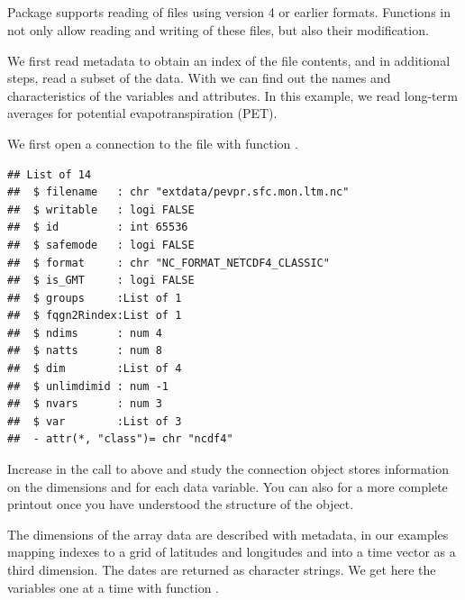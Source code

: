 \documentclass[krantz2]{krantz}\usepackage{knitr}
\begin{document}
\subsection[ncdf4]{}



Package  supports reading of files using  version 4 or earlier formats. Functions in  not only allow reading and writing of these files, but also their modification.

We first read metadata to obtain an index of the file contents, and in additional steps, read a subset of the data. With  we can find out the names and characteristics of the variables and attributes. In this example, we read long-term averages for potential evapotranspiration (PET).

We first open a connection to the file with function .

\begin{knitrout}\footnotesize
{}\color{fgcolor}\begin{kframe}
\begin{alltt}
 \hlkwb{<-} \hlstd{(}\hlstd{)}
  \hlstd{=} \hlstd{)}
\end{alltt}
\begin{verbatim}
## List of 14
##  $ filename   : chr "extdata/pevpr.sfc.mon.ltm.nc"
##  $ writable   : logi FALSE
##  $ id         : int 65536
##  $ safemode   : logi FALSE
##  $ format     : chr "NC_FORMAT_NETCDF4_CLASSIC"
##  $ is_GMT     : logi FALSE
##  $ groups     :List of 1
##  $ fqgn2Rindex:List of 1
##  $ ndims      : num 4
##  $ natts      : num 8
##  $ dim        :List of 4
##  $ unlimdimid : num -1
##  $ nvars      : num 3
##  $ var        :List of 3
##  - attr(*, "class")= chr "ncdf4"
\end{verbatim}
\end{kframe}
\end{knitrout}

\begin{advplayground}
Increase  in the call to  above and study the connection object stores information on the dimensions and for each data variable. You can also  for a more complete printout once you have understood the structure of the object.
\end{advplayground}
The dimensions of the array data are described with metadata, in our examples mapping indexes to a grid of latitudes and longitudes and into a time vector as a third dimension. The dates are returned as character strings. We get here the variables one at a time with function .
\end{document}
